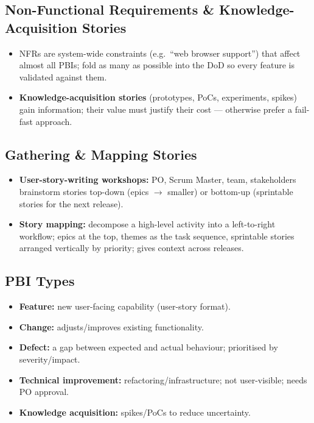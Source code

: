\documentclass[hidelinks]{article}
\begin{document}
\subsection{Non-Functional Requirements \& Knowledge-Acquisition Stories}
\begin{itemize}
  \item NFRs are system-wide constraints (e.g.\ ``web browser support'') that affect almost all
        PBIs; fold as many as possible into the DoD so every feature is validated against them.
  \item \textbf{Knowledge-acquisition stories} (prototypes, PoCs, experiments, spikes) gain
        information; their value must justify their cost --- otherwise prefer a fail-fast approach.
\end{itemize}

\subsection{Gathering \& Mapping Stories}
\begin{itemize}
  \item \textbf{User-story-writing workshops:} PO, Scrum Master, team, stakeholders brainstorm
        stories top-down (epics $\to$ smaller) or bottom-up (sprintable stories for the next release).
  \item \textbf{Story mapping:} decompose a high-level activity into a left-to-right workflow;
        epics at the top, themes as the task sequence, sprintable stories arranged vertically by
        priority; gives context across releases.
\end{itemize}

\subsection{PBI Types}
\begin{itemize}
  \item \textbf{Feature:} new user-facing capability (user-story format).
  \item \textbf{Change:} adjusts/improves existing functionality.
  \item \textbf{Defect:} a gap between expected and actual behaviour; prioritised by severity/impact.
  \item \textbf{Technical improvement:} refactoring/infrastructure; not user-visible; needs PO approval.
  \item \textbf{Knowledge acquisition:} spikes/PoCs to reduce uncertainty.
\end{itemize}
\end{document}
